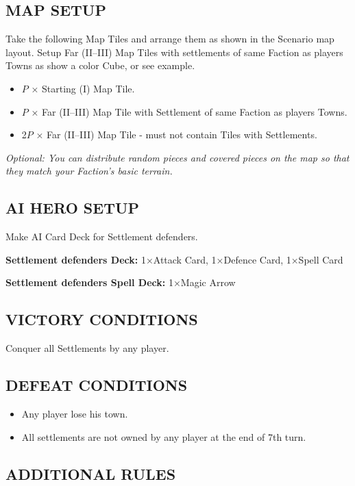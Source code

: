 \begin{multicols*}{2}
\subsection*{\MakeUppercase{Map Setup}}

Take the following Map Tiles and arrange them as shown in the Scenario map layout.
Setup Far (II--III) Map Tiles with settlements of same Faction as players Towns as show a color Cube, or see example.

\begin{itemize}
  \item $P$ × Starting (I) Map Tile.
  \item $P$ × Far (II--III) Map Tile with Settlement of same Faction as players Towns.
  \item 2$P$ × Far (II--III) Map Tile - must not contain Tiles with Settlements.
\end{itemize}

\textit{Optional: You can distribute random pieces and covered pieces on the map so that they match your Faction's basic terrain.}

\subsection*{\MakeUppercase{AI Hero Setup}}

Make AI Card Deck for Settlement defenders.

\textbf{Settlement defenders Deck:} 1×Attack Card, 1×Defence Card, 1×Spell Card

\textbf{Settlement defenders Spell Deck:} 1×Magic Arrow

\subsection*{\MakeUppercase{Victory Conditions}}
Conquer all Settlements by any player.

\subsection*{\MakeUppercase{Defeat Conditions}}

\begin{itemize}
  \item Any player lose his town.
  \item All settlements are not owned by any player at the end of 7th turn.
\end{itemize}

\subsection*{\MakeUppercase{Additional Rules}}


\end{multicols*}
